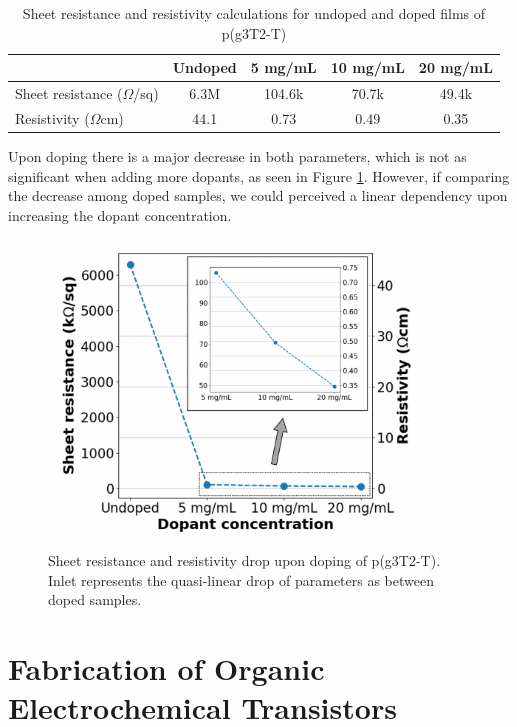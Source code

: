 \begin{table}[ht]
\centering
\caption{Sheet resistance and resistivity calculations for undoped and doped films of p(g3T2-T)}
\begin{tabular}{l|c|c|c|c}
& Undoped & 5 mg/mL & 10 mg/mL & 20 mg/mL \\\hline
Sheet resistance ($\Omega$/sq) & 6.3M & 104.6k & 70.7k & 49.4k\\
Resistivity ($\Omega$cm) & 44.1 & 0.73 & 0.49 & 0.35\\\hline
\end{tabular}
\label{tab:res}
\end{table}

Upon doping there is a major decrease in both parameters, which is not as significant when adding more dopants, as seen in Figure \ref{fig:rho}. However, if comparing the decrease among doped samples, we could perceived a linear dependency upon increasing the dopant concentration. 

\begin{figure}[ht]
  \centering
  \includegraphics[width=10cm]{Images/pdf/resist+inlet.pdf}
  \caption[Sheet resistance and resistivity drop upon doping]{Sheet resistance and resistivity drop upon doping of p(g3T2-T). Inlet represents the quasi-linear drop of parameters as between doped samples.}
  \label{fig:rho}
\end{figure}


\section{Fabrication of Organic Electrochemical Transistors}

